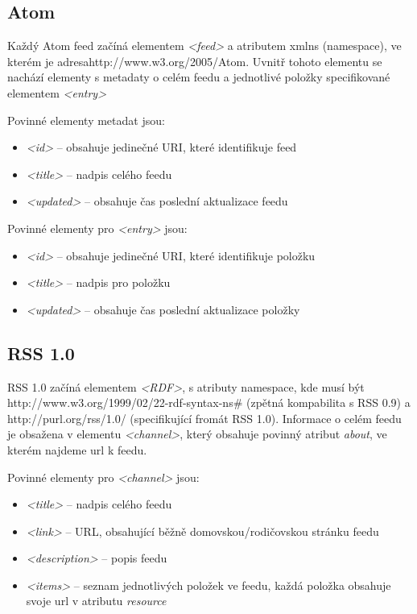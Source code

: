 \documentclass[11pt] {article}
\begin{document}
\subsection{Atom}
\hspace{5mm}Každý Atom feed začíná elementem \emph{<feed>} a atributem xmlns (namespace), ve kterém je adresa\newline http://www.w3.org/2005/Atom. Uvnitř tohoto elementu se nachází elementy s metadaty o celém feedu a jednotlivé položky specifikované elementem \emph{<entry>} \cite{Atom}\cite{Atom2}\newline

Povinné elementy metadat jsou:
\begin{itemize}
\item \emph{<id>} -- obsahuje jedinečné URI, které identifikuje feed
\item \emph{<title>} -- nadpis celého feedu
\item \emph{<updated>} -- obsahuje čas poslední aktualizace feedu\newline
\end{itemize}

Povinné elementy pro \emph{<entry>} jsou:
\begin{itemize}
\item \emph{<id>} -- obsahuje jedinečné URI, které identifikuje položku
\item \emph{<title>} -- nadpis pro položku
\item \emph{<updated>} -- obsahuje čas poslední aktualizace položky
\end{itemize}

\subsection{RSS 1.0}
\hspace{5mm}RSS 1.0 začíná elementem \emph{<RDF>}, s atributy namespace, kde musí být http://www.w3.org/1999/02/22-rdf-syntax-ns\# (zpětná kompabilita s RSS 0.9) a http://purl.org/rss/1.0/ (specifikující fromát RSS 1.0). Informace o celém feedu je obsažena v elementu \emph{<channel>}, který obsahuje povinný atribut \emph{about}, ve kterém najdeme url k feedu.\cite{rss1}

Povinné elementy pro \emph{<channel>} jsou:
\begin{itemize}
\item \emph{<title>} -- nadpis celého feedu
\item \emph{<link>} -- URL, obsahující běžně domovskou/rodičovskou stránku feedu 
\item \emph{<description>} -- popis feedu 
\item \emph{<items>} -- seznam jednotlivých položek ve feedu, každá položka obsahuje svoje url v atributu \emph{resource}
\newline
\end{itemize}
\end{document}
